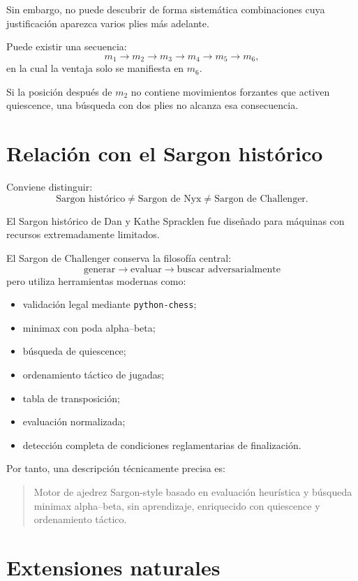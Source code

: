 \documentclass[11pt,a4paper]{article}
\begin{document}
Sin embargo, no puede descubrir de forma sistemática combinaciones cuya
justificación aparezca varios plies más adelante.

Puede existir una secuencia:
\[
m_1\rightarrow
m_2\rightarrow
m_3\rightarrow
m_4\rightarrow
m_5\rightarrow
m_6,
\]
en la cual la ventaja solo se manifiesta en $m_6$.

Si la posición después de $m_2$ no contiene movimientos forzantes que activen
quiescence, una búsqueda con dos plies no alcanza esa consecuencia.

\section{Relación con el Sargon histórico}

Conviene distinguir:
\[
\text{Sargon histórico}
\neq
\text{Sargon de Nyx}
\neq
\text{Sargon de Challenger}.
\]

El Sargon histórico de Dan y Kathe Spracklen fue diseñado para máquinas con
recursos extremadamente limitados.

El Sargon de Challenger conserva la filosofía central:
\[
\boxed{
\text{generar}
\rightarrow
\text{evaluar}
\rightarrow
\text{buscar adversarialmente}
}
\]
pero utiliza herramientas modernas como:

\begin{itemize}
    \item validación legal mediante \texttt{python-chess};
    \item minimax con poda alpha--beta;
    \item búsqueda de quiescence;
    \item ordenamiento táctico de jugadas;
    \item tabla de transposición;
    \item evaluación normalizada;
    \item detección completa de condiciones reglamentarias de finalización.
\end{itemize}

Por tanto, una descripción técnicamente precisa es:

\begin{quote}
Motor de ajedrez Sargon-style basado en evaluación heurística y búsqueda minimax
alpha--beta, sin aprendizaje, enriquecido con quiescence y ordenamiento táctico.
\end{quote}

\section{Extensiones naturales}
\end{document}
